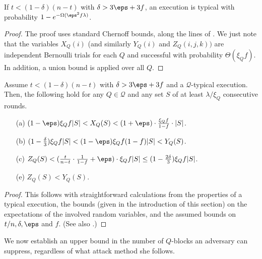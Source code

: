 \begin{theorem}\label{theorem:alltypical}%
	If $t<(1-\delta)(n-t)$ with $\delta>3\eps+3f$,
	an execution is typical with probability $1-e^{-\Omega(\eps^2f\lambda)}$.
\end{theorem}
\begin{proof}
	The proof uses standard Chernoff bounds, along the lines of \cite{backbone-new}.
	We just note that the variables $X_Q(i)$ (and similarly $Y_Q(i)$ and
	$Z_Q(i,j,k))$ are independent Bernoulli trials for each $Q$ and successful
	with probability $\Theta(\xi_Qf)$. In addition, a union bound is applied
	over all $Q$.
\end{proof}%

\begin{lemma}\label{lemma:typical}%
	Assume $t<(1-\delta)(n-t)$ with $\delta>3\eps+3f$ and a $\mathcal{Q}$-typical
	execution.
	Then, the following hold for any $Q\in\mathcal{Q}$ and any set $S$ of at least
	$\lambda/\xi_Q$ consecutive rounds.
	\begin{itemize}
	\item[(a)]
		$(1-\eps)\xi_Qf|S|<X_Q(S)<(1+\eps)\cdot\frac{\xi_Qf}{1-f}\cdot|S|$.
	\item[(b)]
			$(1-\frac\delta3)\xi_Qf|S|<(1-\eps)\xi_Qf(1-f)|S|<Y_Q(S)$.
	\item[(c)]
		$Z_Q(S)<(\frac t{n-t}\cdot\frac1{1-f}+\eps)\cdot\xi_Qf|S|
			\le(1-\frac{2\delta}3)\xi_Qf|S|$.
	\item[(e)] $Z_Q(S)<Y_Q(S)$.
	\end{itemize}
\end{lemma}
\begin{proof}
	This follows with straightforward calculations from the properties of
	a typical execution, the bounds (given in the introduction of this section)
	on the expectations of the involved random variables, and the assumed bounds
	on $t/n,\delta,\eps$ and $f$. (See also \cite{backbone-new}.)
\end{proof}

We now establish an upper bound in the number of
$Q$-blocks an adversary can suppress, regardless of what attack method she
follows.

